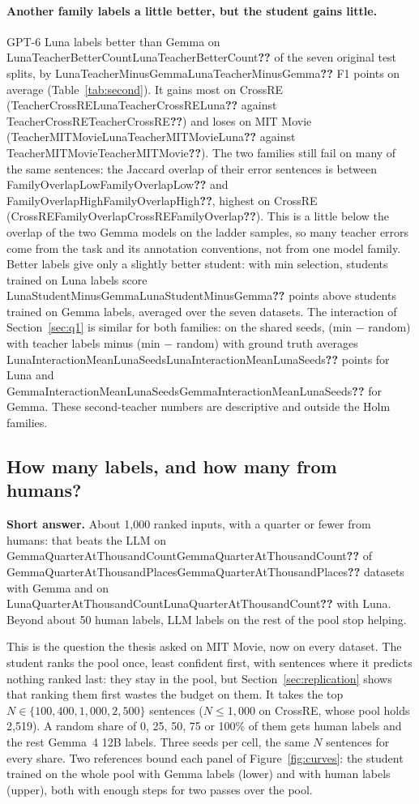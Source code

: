 \documentclass[11pt]{article}
\newcommand{\res}[1]{\ifcsname #1\endcsname\csname #1\endcsname\else\textbf{??}\fi}
\newcommand{\answer}[1]{\noindent\textbf{Short answer.} #1\par\medskip}
\begin{document}
\paragraph{Another family labels a little better, but the student gains little.} GPT-6 Luna labels better than Gemma on \res{LunaTeacherBetterCount} of the seven original test splits, by \res{LunaTeacherMinusGemma} F1 points on average (Table~\ref{tab:second}). It gains most on CrossRE (\res{TeacherCrossRELuna} against \res{TeacherCrossRE}) and loses on MIT Movie (\res{TeacherMITMovieLuna} against \res{TeacherMITMovie}). The two families still fail on many of the same sentences: the Jaccard overlap of their error sentences is between \res{FamilyOverlapLow} and \res{FamilyOverlapHigh}, highest on CrossRE (\res{CrossREFamilyOverlap}). This is a little below the overlap of the two Gemma models on the ladder samples, so many teacher errors come from the task and its annotation conventions, not from one model family. Better labels give only a slightly better student: with min selection, students trained on Luna labels score \res{LunaStudentMinusGemma} points above students trained on Gemma labels, averaged over the seven datasets. The interaction of Section~\ref{sec:q1} is similar for both families: on the shared seeds, (min $-$ random) with teacher labels minus (min $-$ random) with ground truth averages \res{LunaInteractionMeanLunaSeeds} points for Luna and \res{GemmaInteractionMeanLunaSeeds} for Gemma. These second-teacher numbers are descriptive and outside the Holm families.

\subsection{How many labels, and how many from humans?}
\label{sec:curves}

\answer{About 1{,}000 ranked inputs, with a quarter or fewer from humans: that beats the LLM on \res{GemmaQuarterAtThousandCount} of \res{GemmaQuarterAtThousandPlaces} datasets with Gemma and on \res{LunaQuarterAtThousandCount} with Luna. Beyond about 50 human labels, LLM labels on the rest of the pool stop helping.}

This is the question the thesis asked on MIT Movie, now on every dataset. The student ranks the pool once, least confident first, with sentences where it predicts nothing ranked last: they stay in the pool, but Section~\ref{sec:replication} shows that ranking them first wastes the budget on them. It takes the top $N \in \{100, 400, 1{,}000, 2{,}500\}$ sentences ($N \le 1{,}000$ on CrossRE, whose pool holds 2{,}519). A random share of 0, 25, 50, 75 or 100\% of them gets human labels and the rest Gemma~4 12B labels. Three seeds per cell, the same $N$ sentences for every share. Two references bound each panel of Figure~\ref{fig:curves}: the student trained on the whole pool with Gemma labels (lower) and with human labels (upper), both with enough steps for two passes over the pool.
\end{document}
